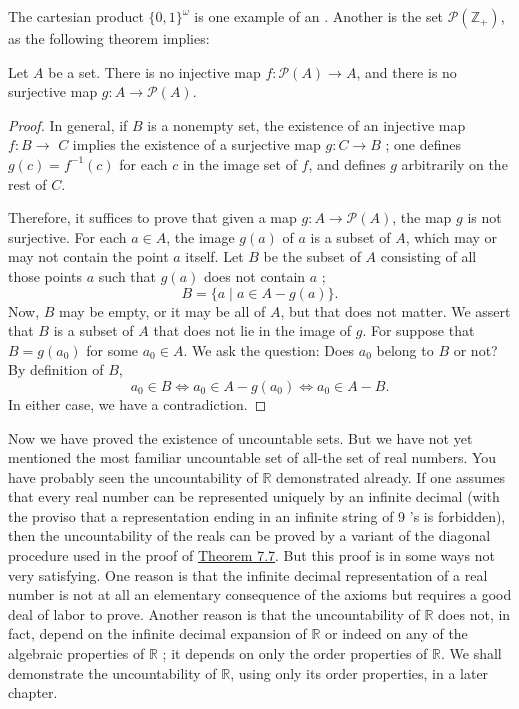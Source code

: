 The cartesian product \(\{ 0, 1 \}^{\omega }\) is one example of an . Another is the set \(\mathcal{P}(\mathbb{Z}_{+})\), as the following theorem implies:

\begin{theorem}
\label{thm:\thetheorem}
 Let \(A\) be a set. There is no injective map \(f : \mathcal{P}(A) \rightarrow A\), and there is no surjective map \(g : A \rightarrow \mathcal{P}(A)\).
\end{theorem}

\begin{proof}
 In general, if \(B\) is a nonempty set, the existence of an injective map \(f : B \rightarrow\) \(C\) implies the existence of a surjective map \(g : C \rightarrow B\) ; one defines \(g( c) = f^{-1}( c)\) for each \(c\) in the image set of \(f\), and defines \(g\) arbitrarily on the rest of \(C\).

 Therefore, it suffices to prove that given a map \(g : A \rightarrow \mathcal{P}(A)\), the map \(g\) is not surjective. For each \(a \in A\), the image \(g(a)\) of \(a\) is a subset of \(A\), which may or may not contain the point \(a\) itself. Let \(B\) be the subset of \(A\) consisting of all those points \(a\) such that \(g(a)\) does not contain \(a\) ;
 \[
 B = \{ a \mid a \in A - g(a) \}.
 \]
 Now, \(B\) may be empty, or it may be all of \(A\), but that does not matter. We assert that \(B\) is a subset of \(A\) that does not lie in the image of \(g\). For suppose that \(B = g(a_{0})\) for some \(a_{0} \in A\). We ask the question: Does \(a_{0}\) belong to \(B\) or not? By definition of \(B\),
 \[
 a_{0} \in B \Leftrightarrow {a}_{0} \in A - g(a_{0}) \Leftrightarrow {a}_{0} \in A - B.
 \]
 In either case, we have a contradiction.
\end{proof}

Now we have proved the existence of uncountable sets. But we have not yet mentioned the most familiar uncountable set of all-the set of real numbers. You have probably seen the uncountability of \(\mathbb{R}\) demonstrated already. If one assumes that every real number can be represented uniquely by an infinite decimal (with the proviso that a representation ending in an infinite string of 9 's is forbidden), then the uncountability of the reals can be proved by a variant of the diagonal procedure used in the proof of \hyperref[thm:7.7]{Theorem 7.7}. But this proof is in some ways not very satisfying. One reason is that the infinite decimal representation of a real number is not at all an elementary consequence of the axioms but requires a good deal of labor to prove. Another reason is that the uncountability of \(\mathbb{R}\) does not, in fact, depend on the infinite decimal expansion of \(\mathbb{R}\) or indeed on any of the algebraic properties of \(\mathbb{R}\) ; it depends on only the order properties of \(\mathbb{R}\). We shall demonstrate the uncountability of \(\mathbb{R}\), using only its order properties, in a later chapter.


